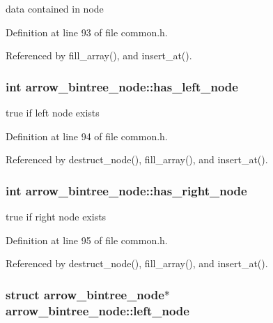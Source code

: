 data contained in node 

Definition at line 93 of file common.h.

Referenced by fill\_\-array(), and insert\_\-at().\hypertarget{structarrow__bintree__node_a359d3d029023fb8763af3329207ee53}{
\subsubsection{\setlength{\rightskip}{0pt plus 5cm}int {\bf arrow\_\-bintree\_\-node::has\_\-left\_\-node}}}
\label{structarrow__bintree__node_a359d3d029023fb8763af3329207ee53}


true if left node exists 

Definition at line 94 of file common.h.

Referenced by destruct\_\-node(), fill\_\-array(), and insert\_\-at().\hypertarget{structarrow__bintree__node_f6f8bb35c520a88841a810777e9bc186}{
\subsubsection{\setlength{\rightskip}{0pt plus 5cm}int {\bf arrow\_\-bintree\_\-node::has\_\-right\_\-node}}}
\label{structarrow__bintree__node_f6f8bb35c520a88841a810777e9bc186}


true if right node exists 

Definition at line 95 of file common.h.

Referenced by destruct\_\-node(), fill\_\-array(), and insert\_\-at().\hypertarget{structarrow__bintree__node_e7eb125cad02704a57796b16c49b2983}{
\subsubsection{\setlength{\rightskip}{0pt plus 5cm}struct {\bf arrow\_\-bintree\_\-node}$\ast$ {\bf arrow\_\-bintree\_\-node::left\_\-node}}}
\label{structarrow__bintree__node_e7eb125cad02704a57796b16c49b2983}


